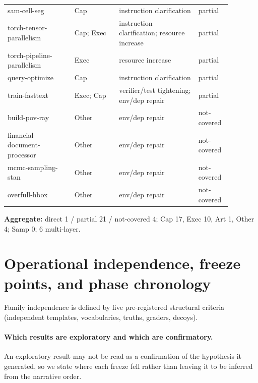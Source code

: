 \documentclass{article}
\begin{document}
\begin{longtable}{p{0.27\linewidth} p{0.18\linewidth} p{0.32\linewidth} p{0.11\linewidth}}
sam-cell-seg & Cap & instruction clarification & partial \\
torch-tensor-parallelism & Cap; Exec & instruction clarification; resource increase & partial \\
torch-pipeline-parallelism & Exec & resource increase & partial \\
query-optimize & Cap & instruction clarification & partial \\
train-fasttext & Exec; Cap & verifier/test tightening; env/dep repair & partial \\
build-pov-ray & Other & env/dep repair & not-covered \\
financial-document-processor & Other & env/dep repair & not-covered \\
mcmc-sampling-stan & Other & env/dep repair & not-covered \\
overfull-hbox & Other & env/dep repair & not-covered \\
\bottomrule
\end{longtable}
\textbf{Aggregate:} direct 1 / partial 21 / not-covered 4; Cap 17, Exec 10, Art 1, Other 4; Samp 0; 6 multi-layer.

\section{Operational independence, freeze points, and phase chronology}
\label{app:chrono}
Family independence is defined by five pre-registered structural criteria (independent templates, vocabularies, truths, graders, decoys).

\paragraph{Which results are exploratory and which are confirmatory.} An exploratory result may not be read as a confirmation of the hypothesis it generated, so we state where each freeze fell rather than leaving it to be inferred from the narrative order.
\end{document}
